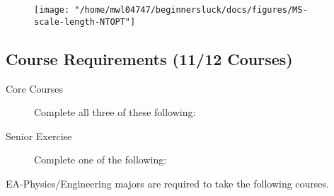\documentclass{article}\usepackage[]{graphicx}\usepackage[]{xcolor}
\newenvironment{itemize*}%
  {\begin{itemize}%
    \setlength{\itemsep}{0pt}%
    \setlength{\parskip}{0pt}}%
  {\end{itemize}}
\begin{document}
\begin{figure}[h]
\centering
  \texttt{[image: "/home/mwl04747/beginnersluck/docs/figures/MS-scale-length-NTOPT"]}
\end{figure}


\subsection{Course Requirements (11/12 Courses)}

\begin{description}
  
 \item[Core Courses] Complete all three of these following:
  

  \item[Senior Exercise] Complete one of the following:
  

\end{description}

\noindent EA-Physics/Engineering majors are required to take the following courses.
\end{document}
